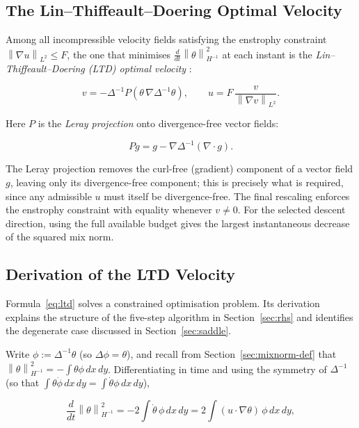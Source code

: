 \documentclass[12pt,a4paper]{article}
\newcommand{\norm}[1]{\left\lVert#1\right\rVert}
\newcommand{\Lap}{\Delta}
\newcommand{\lapinv}{\Delta^{-1}}
\newcommand{\Proj}{P}
\newcommand{\dx}{\,dx\,dy}
\theoremstyle{definition}
\theoremstyle{plain}
\begin{document}
\subsection{The Lin--Thiffeault--Doering Optimal Velocity}
\label{sec:ltd}

Among all incompressible velocity fields satisfying the enstrophy constraint
$\norm{\nabla u}_{L^2} \le F$, the one that minimises
$\frac{d}{dt}\norm{\theta}_{H^{-1}}^2$ at each instant is the
\emph{Lin--Thiffeault--Doering (LTD) optimal velocity}
\cite{LTD2011}:

\begin{equation}
  \label{eq:ltd}
  v = -\lapinv \Proj\!\left(\theta\,\nabla\lapinv\theta\right),
  \qquad
  u = F\,\frac{v}{\norm{\nabla v}_{L^2}}.
\end{equation}

Here $\Proj$ is the \emph{Leray projection} onto divergence-free vector
fields:

\begin{equation}
  \label{eq:leray}
  \Proj g = g - \nabla\lapinv(\nabla\cdot g).
\end{equation}

The Leray projection removes the curl-free (gradient) component of a vector
field $g$, leaving only its divergence-free component; this is precisely
what is required, since any admissible $u$ must itself be divergence-free.
The final rescaling enforces the enstrophy constraint with equality whenever
$v\ne0$. For the selected descent direction, using the full available
budget gives the largest instantaneous decrease of the squared mix norm.

\subsection{Derivation of the LTD Velocity}
\label{sec:derivation}

Formula~\eqref{eq:ltd} solves a constrained optimisation problem. Its
derivation explains the structure of the five-step algorithm in
Section~\ref{sec:rhs} and identifies the degenerate case discussed in
Section~\ref{sec:saddle}.

Write $\phi := \lapinv\theta$ (so $\Lap\phi=\theta$), and recall from
Section~\ref{sec:mixnorm-def} that $\norm{\theta}_{H^{-1}}^2 =
-\int\theta\phi\dx$. Differentiating in time and using the symmetry of
$\Lap^{-1}$ (so that $\int\theta\dot\phi\dx = \int\dot\theta\phi\dx$),

\begin{equation}
  \frac{d}{dt}\norm{\theta}_{H^{-1}}^2
  = -2\int \dot\theta\,\phi \dx
  = 2\int (u\cdot\nabla\theta)\,\phi\dx,
\end{equation}
\end{document}
